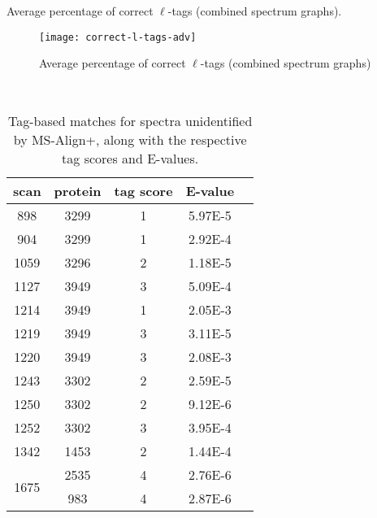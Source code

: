 \documentclass{article}[12pt]
\begin{document}
\begin{landscape}
\begin{table}[h]
\caption{ Average percentage of correct $\ell$-tags (combined spectrum graphs).}
\label{table:correct-l-tags-adv}

\vspace{3mm}
\end{table}
\end{landscape}

\begin{figure}
  \begin{center}
\texttt{[image: correct-l-tags-adv]}
\end{center}
\caption{Average percentage of correct $\ell$-tags (combined spectrum graphs)}
  \label{fig:correct-l-tags-adv}
\end{figure}


\begin{landscape}

\begin{table}[t]\footnotesize
\vspace{3mm}\
{\centering
\begin{center}
\begin{tabular}{|c|c|c|c|c|}
\hline
scan & protein & tag score & E-value \\
\hline
\hline
898 & 3299 & 1 & 5.97E-5\\
\hline
904 & 3299 & 1 & 2.92E-4\\
\hline
1059 & 3296 & 2 & 1.18E-5\\
\hline
1127 & 3949 & 3 & 5.09E-4\\
\hline
1214 & 3949 & 1 & 2.05E-3\\
\hline
1219 & 3949 & 3 & 3.11E-5\\
\hline
1220 & 3949 & 3 & 2.08E-3\\
\hline
1243 & 3302 & 2 & 2.59E-5\\
\hline
1250 & 3302 & 2 & 9.12E-6\\
\hline
1252 & 3302 & 3 & 3.95E-4\\
\hline
1342 & 1453 & 2 & 1.44E-4\\
\hline
\multirow{2}{*}{1675} & 2535 & 4 & 2.76E-6\\
& 983 & 4 & 2.87E-6\\
\hline
\end{tabular}
\end{center}
\par}
\centering
\caption{Tag-based matches for spectra unidentified by MS-Align+, along with the respective tag scores and E-values.}
\vspace{3mm}
\label{table:unident-spectra}
\end{table}
\end{landscape}
\end{document}
